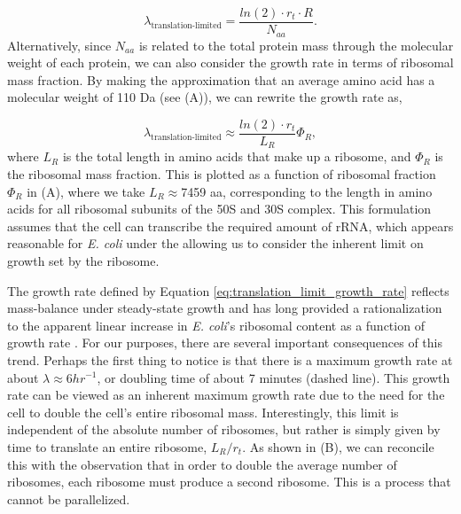 \begin{equation}
\lambda_{\textrm{translation-limited}} = \frac{ln(2) \cdot r_t \cdot R}{N_{aa}}.
\end{equation}
Alternatively, since $N_{aa}$ is related to the total protein mass through the
molecular weight of each protein, we can also consider the growth rate in terms
of ribosomal mass fraction. By making the approximation that an average amino
acid has a molecular weight of 110 Da (see (A)), we can
rewrite the growth rate as,

\begin{equation}
\lambda_{\textrm{translation-limited}} \approx \frac{ln(2) \cdot r_t}{L_R}  \Phi_R,
\label{eq:translation_limit_growth_rate}
\end{equation}
where $L_R$ is the total length in amino acids that make up a ribosome, and
$\Phi_R$ is the ribosomal mass fraction. This is plotted as a function of
ribosomal fraction $\Phi_R$ in (A), where we take $L_R
\approx $7459 aa, corresponding to the length in amino acids for all ribosomal
subunits of the 50S and 30S complex. This formulation assumes that the cell can
transcribe the required amount of rRNA, which appears reasonable for  \textit{E.
coli} under the  allowing us to consider the inherent limit on growth set by the
ribosome.

The growth rate defined by Equation \ref{eq:translation_limit_growth_rate}
reflects  mass-balance under steady-state growth and has long provided a
rationalization to the apparent linear increase in \textit{E. coli}'s ribosomal
content as a function of growth rate \citep{Goldberger1979, scott2010}. For our
purposes, there are several important consequences of this  trend. Perhaps the
first thing to notice is that there is a maximum growth rate at about $\lambda
\approx 6 hr^{-1}$, or doubling time of about 7 minutes (dashed line). This
growth rate can be viewed as an inherent maximum growth rate due to the need for
the cell to double the cell's entire ribosomal mass. Interestingly, this limit
is independent of the absolute number of ribosomes, but rather is simply given
by time to translate an entire ribosome, $L_R/ r_t$. As shown in
(B), we can reconcile this with the observation that in order
to double the average number of ribosomes, each ribosome must produce a second
ribosome. This is a process that cannot be parallelized.

